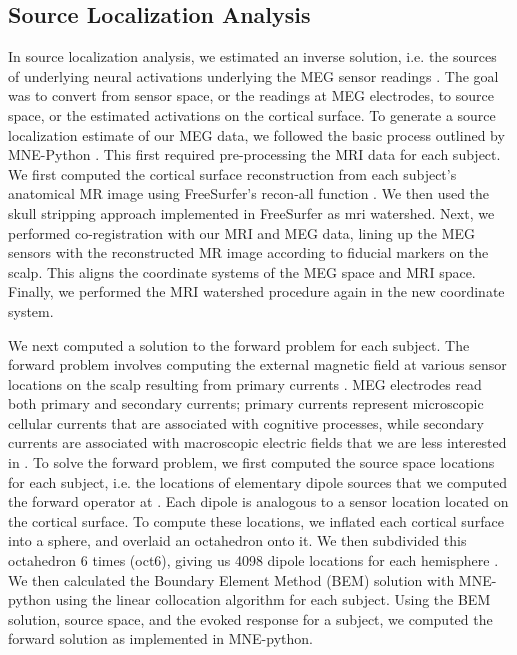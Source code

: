 \documentclass[../main.tex]{subfiles}
\begin{document}
\subsection*{Source Localization Analysis}
In source localization analysis, we estimated an inverse solution, i.e. the sources of underlying neural activations underlying the MEG sensor readings \citep{mne}. The goal was to convert from sensor space, or the readings at MEG electrodes, to source space, or the estimated activations on the cortical surface. To generate a source localization estimate of our MEG data, we followed the basic process outlined by MNE-Python \citep{mne}. This first required pre-processing the MRI data for each subject. We first computed the cortical surface reconstruction from each subject's anatomical MR image using FreeSurfer's recon-all function \citep{DALE1999179}. We then used the skull stripping approach \citep{segonne_2004} implemented in FreeSurfer as mri watershed. Next, we performed co-registration with our MRI and MEG data, lining up the MEG sensors with the reconstructed MR image according to fiducial markers on the scalp. This aligns the coordinate systems of the MEG space and MRI space. Finally, we performed the MRI watershed procedure again in the new coordinate system.

We next computed a solution to the forward problem for each subject. The forward problem involves computing the external magnetic field at various sensor locations on the scalp resulting from primary currents \citep{mosher99}. MEG electrodes read both primary and secondary currents; primary currents represent microscopic cellular currents that are associated with cognitive processes, while secondary currents are associated with macroscopic electric fields that we are less interested in \citep{mosher99}. To solve the forward problem, we first computed the source space locations for each subject, i.e. the locations of elementary dipole sources that we computed the forward operator at \citep{mne}. Each dipole is analogous to a sensor location located on the cortical surface. To compute these locations, we inflated each cortical surface into a sphere, and overlaid an octahedron onto it. We then subdivided this octahedron 6 times (oct6), giving us 4098 dipole locations for each hemisphere \citep{mne}. We then calculated the Boundary Element Method (BEM) solution with MNE-python using the linear collocation algorithm \citep{mosher99, hamalainen89} for each subject. Using the BEM solution, source space, and the evoked response for a subject, we computed the forward solution as implemented in MNE-python.
\end{document}
